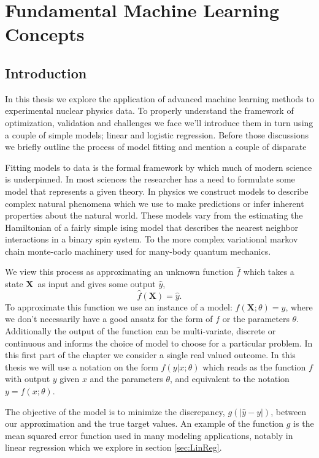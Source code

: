 \chapter{Fundamental Machine Learning Concepts}
\section{Introduction}

In this thesis we explore the application of advanced machine learning methods to experimental nuclear physics data. To properly understand the framework of optimization, validation and challenges we face we'll introduce them in turn using a couple of simple models; linear and logistic regression. Before those discussions we briefly outline the process of model fitting and mention a couple of disparate 

Fitting models to data is the formal framework by which much of modern science is underpinned. In most sciences the researcher has a need to formulate some model that represents a given theory. In physics we construct models to describe complex natural phenomena which we use to make predictions or infer inherent properties about the natural world. These models vary from the estimating the Hamiltonian of a fairly simple ising model that describes the nearest neighbor interactions in a binary spin system. To the more complex variational markov chain monte-carlo machinery used for many-body quantum mechanics.

We view this process as approximating an unknown function $\hat{f}$ which takes a state $\mathbf{X}$ as input and gives some output $\hat{y}$,  
 $$\hat{f}(\mathbf{X}) = \hat{y}.$$ 
To approximate this function we use an instance of a model: $f(\mathbf{X}; \theta) = y$, where we don't necessarily have a good ansatz for the form of $f$ or the parameters $\theta$. Additionally the output of the function can be multi-variate, discrete or continuous and informs the choice of model to choose for a particular problem. In this first part of the chapter we consider a single real valued outcome. In this thesis we will use a notation on the form $f(y | x; \theta )$ which reads as the function $f$ with output $y$ given $x$ and the parameters $\theta$, and equivalent to the notation $y = f(x; \theta)$.

 The objective of the model is to minimize the discrepancy, $g(|\hat{y} - y|)$, between our approximation and the true target values. An  example of the function $g$ is the mean squared error function used in many modeling applications, notably in linear regression which we explore in section \ref{sec:LinReg}.

